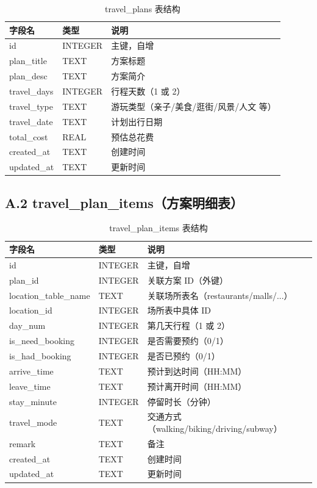 \documentclass[12pt,a4paper]{ctexart}
\begin{document}
\begin{table}[ht]
\centering
\begin{tabular}{p{3cm}p{2cm}p{8cm}}
\toprule
\textbf{字段名} & \textbf{类型} & \textbf{说明} \\
\midrule
id            & INTEGER  & 主键，自增 \\
plan\_title   & TEXT     & 方案标题 \\
plan\_desc    & TEXT     & 方案简介 \\
travel\_days  & INTEGER  & 行程天数（1 或 2） \\
travel\_type  & TEXT     & 游玩类型（亲子/美食/逛街/风景/人文 等） \\
travel\_date  & TEXT     & 计划出行日期 \\
total\_cost   & REAL     & 预估总花费 \\
created\_at   & TEXT     & 创建时间 \\
updated\_at   & TEXT     & 更新时间 \\
\bottomrule
\end{tabular}
\caption{travel\_plans 表结构}
\end{table}

\subsection*{A.2 travel\_plan\_items（方案明细表）}

\begin{table}[ht]
\centering
\begin{tabular}{p{3.2cm}p{2.5cm}p{7.3cm}}
\toprule
\textbf{字段名} & \textbf{类型} & \textbf{说明} \\
\midrule
id                  & INTEGER  & 主键，自增 \\
plan\_id            & INTEGER  & 关联方案 ID（外键） \\
location\_table\_name & TEXT   & 关联场所表名（restaurants/malls/...） \\
location\_id        & INTEGER  & 场所表中具体 ID \\
day\_num            & INTEGER  & 第几天行程（1 或 2） \\
is\_need\_booking   & INTEGER  & 是否需要预约（0/1） \\
is\_had\_booking    & INTEGER  & 是否已预约（0/1） \\
arrive\_time        & TEXT     & 预计到达时间（HH:MM） \\
leave\_time         & TEXT     & 预计离开时间（HH:MM） \\
stay\_minute        & INTEGER  & 停留时长（分钟） \\
travel\_mode        & TEXT     & 交通方式（walking/biking/driving/subway） \\
remark              & TEXT     & 备注 \\
created\_at         & TEXT     & 创建时间 \\
updated\_at         & TEXT     & 更新时间 \\
\bottomrule
\end{tabular}
\caption{travel\_plan\_items 表结构}
\end{table}
\end{document}
